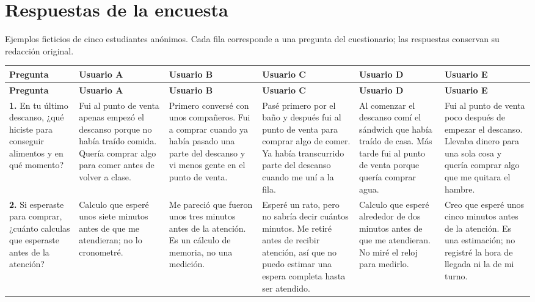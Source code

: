 \documentclass[12pt]{article}
\newcommand{\sol}[1]{{\color{solutionred}\small\strut #1\strut}}
\begin{document}
\section{Respuestas de la encuesta}
Ejemplos ficticios de cinco estudiantes anónimos. Cada fila corresponde a una pregunta del cuestionario; las respuestas conservan su redacción original.
\begingroup\small
\def\vss{\vskip 0pt plus 1fil\relax}
\setlength{\tabcolsep}{4pt}\renewcommand{\arraystretch}{1.12}
\setlength{\LTleft}{0pt plus 1fill}\setlength{\LTright}{0pt plus 1fill}
\begin{longtable}{|*{6}{L{\dimexpr(\arrayrulewidth)/6\relax}|}}
\hline \textbf{Pregunta} & \textbf{Usuario A} & \textbf{Usuario B} & \textbf{Usuario C} & \textbf{Usuario D} & \textbf{Usuario E} \\ \hline
\endfirsthead
\hline \textbf{Pregunta} & \textbf{Usuario A} & \textbf{Usuario B} & \textbf{Usuario C} & \textbf{Usuario D} & \textbf{Usuario E} \\ \hline
\endhead\endfoot\endlastfoot
\textbf{1.} En tu último descanso, ¿qué hiciste para conseguir alimentos y en qué momento? & \sol{Fui al punto de venta apenas empezó el descanso porque no había traído comida. Quería comprar algo para comer antes de volver a clase.} & \sol{Primero conversé con unos compañeros. Fui a comprar cuando ya había pasado una parte del descanso y vi menos gente en el punto de venta.} & \sol{Pasé primero por el baño y después fui al punto de venta para comprar algo de comer. Ya había transcurrido parte del descanso cuando me uní a la fila.} & \sol{Al comenzar el descanso comí el sándwich que había traído de casa. Más tarde fui al punto de venta porque quería comprar agua.} & \sol{Fui al punto de venta poco después de empezar el descanso. Llevaba dinero para una sola cosa y quería comprar algo que me quitara el hambre.} \\ \hline
\textbf{2.} Si esperaste para comprar, ¿cuánto calculas que esperaste antes de la atención? & \sol{Calculo que esperé unos siete minutos antes de que me atendieran; no lo cronometré.} & \sol{Me pareció que fueron unos tres minutos antes de la atención. Es un cálculo de memoria, no una medición.} & \sol{Esperé un rato, pero no sabría decir cuántos minutos. Me retiré antes de recibir atención, así que no puedo estimar una espera completa hasta ser atendido.} & \sol{Calculo que esperé alrededor de dos minutos antes de que me atendieran. No miré el reloj para medirlo.} & \sol{Creo que esperé unos cinco minutos antes de la atención. Es una estimación; no registré la hora de llegada ni la de mi turno.} \\ \hline

\end{longtable}
\end{document}
